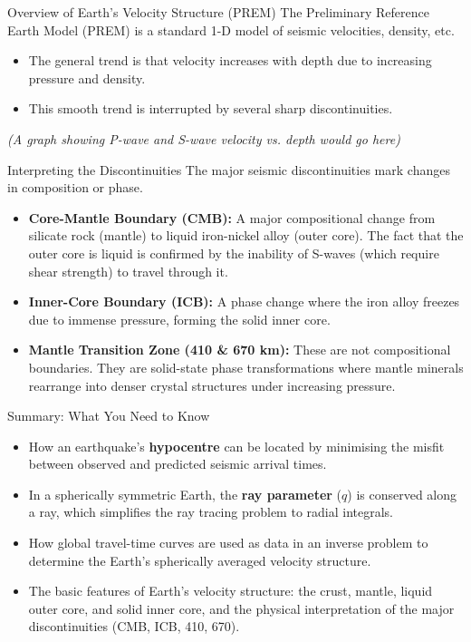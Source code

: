 \documentclass{beamer}
\begin{document}
\begin{frame}{Overview of Earth's Velocity Structure (PREM)}
    The Preliminary Reference Earth Model (PREM) is a standard 1-D model of seismic velocities, density, etc.
    \begin{itemize}
        \item The general trend is that velocity increases with depth due to increasing pressure and density.
        \pause
        \item This smooth trend is interrupted by several sharp discontinuities.
    \end{itemize}
    \begin{center}
        \textit{(A graph showing P-wave and S-wave velocity vs. depth would go here)}
    \end{center}
\end{frame}

\begin{frame}{Interpreting the Discontinuities}
    The major seismic discontinuities mark changes in composition or phase.
    \begin{itemize}
        \item \textbf{Core-Mantle Boundary (CMB):} A major compositional change from silicate rock (mantle) to liquid iron-nickel alloy (outer core). The fact that the outer core is liquid is confirmed by the inability of S-waves (which require shear strength) to travel through it.
        \pause
        \item \textbf{Inner-Core Boundary (ICB):} A phase change where the iron alloy freezes due to immense pressure, forming the solid inner core.
        \pause
        \item \textbf{Mantle Transition Zone (410 \& 670 km):} These are not compositional boundaries. They are solid-state phase transformations where mantle minerals rearrange into denser crystal structures under increasing pressure.
    \end{itemize}
\end{frame}


\begin{frame}{Summary: What You Need to Know}
    \begin{itemize}
        \item How an earthquake's \textbf{hypocentre} can be located by minimising the misfit between observed and predicted seismic arrival times.
        \pause
        \item In a spherically symmetric Earth, the \textbf{ray parameter} ($q$) is conserved along a ray, which simplifies the ray tracing problem to radial integrals.
        \pause
        \item How global travel-time curves are used as data in an inverse problem to determine the Earth's spherically averaged velocity structure.
        \pause
        \item The basic features of Earth's velocity structure: the crust, mantle, liquid outer core, and solid inner core, and the physical interpretation of the major discontinuities (CMB, ICB, 410, 670).
    \end{itemize}
\end{frame}
\end{document}
